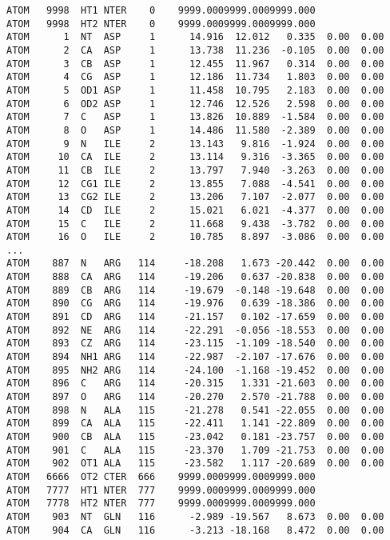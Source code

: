 \documentclass{report}
\begin{document}
\begin{verbatim}
ATOM   9998  HT1 NTER    0    9999.0009999.0009999.000
ATOM   9998  HT2 NTER    0    9999.0009999.0009999.000
ATOM      1  NT  ASP     1      14.916  12.012   0.335  0.00  0.00
ATOM      2  CA  ASP     1      13.738  11.236  -0.105  0.00  0.00
ATOM      3  CB  ASP     1      12.455  11.967   0.314  0.00  0.00
ATOM      4  CG  ASP     1      12.186  11.734   1.803  0.00  0.00
ATOM      5  OD1 ASP     1      11.458  10.795   2.183  0.00  0.00
ATOM      6  OD2 ASP     1      12.746  12.526   2.598  0.00  0.00
ATOM      7  C   ASP     1      13.826  10.889  -1.584  0.00  0.00
ATOM      8  O   ASP     1      14.486  11.580  -2.389  0.00  0.00
ATOM      9  N   ILE     2      13.143   9.816  -1.924  0.00  0.00
ATOM     10  CA  ILE     2      13.114   9.316  -3.365  0.00  0.00
ATOM     11  CB  ILE     2      13.797   7.940  -3.263  0.00  0.00
ATOM     12  CG1 ILE     2      13.855   7.088  -4.541  0.00  0.00
ATOM     13  CG2 ILE     2      13.206   7.107  -2.077  0.00  0.00
ATOM     14  CD  ILE     2      15.021   6.021  -4.377  0.00  0.00
ATOM     15  C   ILE     2      11.668   9.438  -3.782  0.00  0.00
ATOM     16  O   ILE     2      10.785   8.897  -3.086  0.00  0.00
...
ATOM    887  N   ARG   114     -18.208   1.673 -20.442  0.00  0.00
ATOM    888  CA  ARG   114     -19.206   0.637 -20.838  0.00  0.00
ATOM    889  CB  ARG   114     -19.679  -0.148 -19.648  0.00  0.00
ATOM    890  CG  ARG   114     -19.976   0.639 -18.386  0.00  0.00
ATOM    891  CD  ARG   114     -21.157   0.102 -17.659  0.00  0.00
ATOM    892  NE  ARG   114     -22.291  -0.056 -18.553  0.00  0.00
ATOM    893  CZ  ARG   114     -23.115  -1.109 -18.540  0.00  0.00
ATOM    894  NH1 ARG   114     -22.987  -2.107 -17.676  0.00  0.00
ATOM    895  NH2 ARG   114     -24.100  -1.168 -19.452  0.00  0.00
ATOM    896  C   ARG   114     -20.315   1.331 -21.603  0.00  0.00
ATOM    897  O   ARG   114     -20.270   2.570 -21.788  0.00  0.00
ATOM    898  N   ALA   115     -21.278   0.541 -22.055  0.00  0.00
ATOM    899  CA  ALA   115     -22.411   1.141 -22.809  0.00  0.00
ATOM    900  CB  ALA   115     -23.042   0.181 -23.757  0.00  0.00
ATOM    901  C   ALA   115     -23.370   1.709 -21.753  0.00  0.00
ATOM    902  OT1 ALA   115     -23.582   1.117 -20.689  0.00  0.00
ATOM   6666  OT2 CTER  666    9999.0009999.0009999.000
ATOM   7777  HT1 NTER  777    9999.0009999.0009999.000
ATOM   7778  HT2 NTER  777    9999.0009999.0009999.000
ATOM    903  NT  GLN   116      -2.989 -19.567   8.673  0.00  0.00
ATOM    904  CA  GLN   116      -3.213 -18.168   8.472  0.00  0.00

\end{verbatim}
\end{document}
